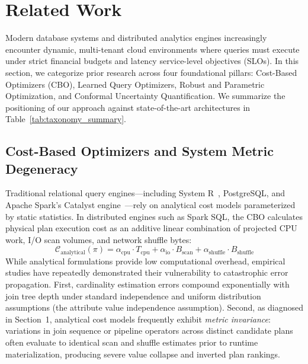 \section{Related Work}
\label{sec:related_work}

Modern database systems and distributed analytics engines increasingly encounter dynamic, multi-tenant cloud environments where queries must execute under strict financial budgets and latency service-level objectives (SLOs). In this section, we categorize prior research across four foundational pillars: Cost-Based Optimizers (CBO), Learned Query Optimizers, Robust and Parametric Optimization, and Conformal Uncertainty Quantification. We summarize the positioning of our approach against state-of-the-art architectures in Table~\ref{tab:taxonomy_summary}.

\subsection{Cost-Based Optimizers and System Metric Degeneracy}
Traditional relational query engines—including System R~\cite{selinger1979access}, PostgreSQL, and Apache Spark's Catalyst engine~\cite{armbrust2015spark}—rely on analytical cost models parameterized by static statistics. In distributed engines such as Spark SQL, the CBO calculates physical plan execution cost as an additive linear combination of projected CPU work, I/O scan volumes, and network shuffle bytes:
\begin{equation}
\mathcal{C}_{\text{analytical}}(\pi) = \alpha_{\text{cpu}} \cdot T_{\text{cpu}} + \alpha_{\text{io}} \cdot B_{\text{scan}} + \alpha_{\text{shuffle}} \cdot B_{\text{shuffle}}
\end{equation}
While analytical formulations provide low computational overhead, empirical studies have repeatedly demonstrated their vulnerability to catastrophic error propagation. First, cardinality estimation errors compound exponentially with join tree depth under standard independence and uniform distribution assumptions (the attribute value independence assumption). Second, as diagnosed in Section~1, analytical cost models frequently exhibit \emph{metric invariance}: variations in join sequence or pipeline operators across distinct candidate plans often evaluate to identical scan and shuffle estimates prior to runtime materialization, producing severe value collapse and inverted plan rankings.

